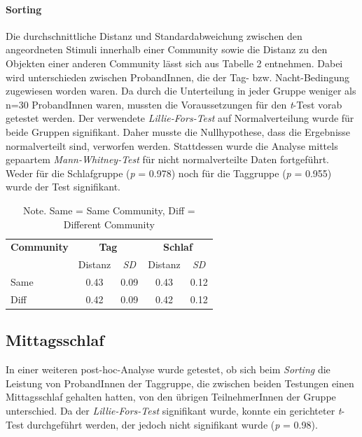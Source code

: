 \paragraph{Sorting}
Die durchschnittliche Distanz und Standardabweichung zwischen den angeordneten Stimuli innerhalb einer Community sowie die Distanz zu den Objekten einer anderen Community lässt sich aus Tabelle 2 entnehmen. Dabei wird unterschieden zwischen ProbandInnen, die der Tag- bzw. Nacht-Bedingung zugewiesen worden waren. Da durch die Unterteilung in jeder Gruppe weniger als n=30 ProbandInnen waren, mussten die Voraussetzungen für den \textit{t}-Test vorab getestet werden. Der verwendete \textit{Lillie-Fors-Test} auf Normalverteilung wurde für beide Gruppen signifikant. Daher musste die Nullhypothese, dass die Ergebnisse normalverteilt sind, verworfen werden. Stattdessen wurde die Analyse mittels gepaartem \textit{Mann-Whitney-Test} für nicht normalverteilte Daten fortgeführt. 
Weder für die Schlafgruppe (\textit{p} = 0.978) noch für die Taggruppe (\textit{p} = 0.955) wurde der Test signifikant.

\begin{table}[h]
\centering
\captionsetup{justification=centering, margin = 1cm}
\begin{tabular}{l c c c c} %
\hline
\textbf{Community} & \multicolumn{2}{c}{\textbf{Tag}} &  \multicolumn{2}{c}{\textbf{Schlaf}}\\
& Distanz & \textit{SD} & Distanz & \textit{SD} \\
\hline
Same & 0.43 & 0.09 & 0.43 & 0.12\\
Diff & 0.42 & 0.09 & 0.42 & 0.12\\
\hline
\end{tabular}
\caption{Note. Same = Same Community, Diff = Different Community}
\end{table}

\subsection{Mittagsschlaf}
In einer weiteren post-hoc-Analyse wurde getestet, ob sich beim \textit{Sorting} die Leistung von ProbandInnen der Taggruppe, die zwischen beiden Testungen einen Mittagsschlaf gehalten hatten, von den übrigen TeilnehmerInnen der Gruppe unterschied. Da der \textit{Lillie-Fors-Test} signifikant wurde, konnte ein gerichteter \textit{t}-Test durchgeführt werden, der jedoch nicht signifikant wurde (\textit{p} = 0.98).

